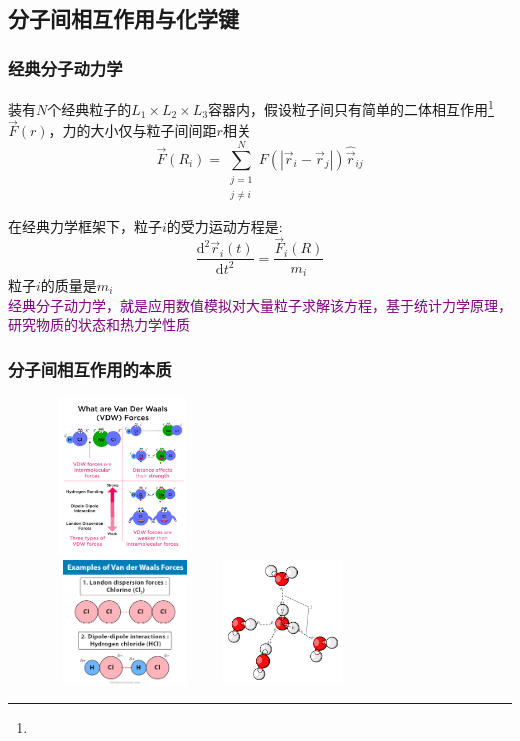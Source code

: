 \subsection{分子间相互作用与化学键}
\frame
{
	\frametitle{经典分子动力学}
	装有$N$个经典粒子的$L_1\times L_2\times L_3$容器内，假设粒子间只有简单的二体相互作用\footnote{\fontsize{7.2pt}{6.2pt}\selectfont{二体作用是粒子间多体相互作用的简化，只考虑粒子两两间彼此相互作用。}}$\vec F(r)$，力的大小仅与粒子间间距$r$相关
	\begin{displaymath}
		\vec F(R_i)=\sum_{\substack{j=1\\j\neq i}}^N F(|\vec r_i-\vec r_j|)\hat{\vec r}_{ij}
	\end{displaymath}
	{\fontsize{7.2pt}{6.2pt}}

	在经典力学框架下，粒子$i$的受力运动方程是:~
	\begin{displaymath}
		\dfrac{\mathrm{d}^2\vec r_i(t)}{\mathrm{d}t^2}=\dfrac{\vec F_i(R)}{m_i}
	\end{displaymath}
	粒子$i$的质量是$m_i$\\
	\textcolor{purple}{经典分子动力学，就是应用数值模拟对大量粒子求解该方程，基于统计力学原理，研究物质的状态和热力学性质}
}

\frame
{
	\frametitle{分子间相互作用的本质}
\begin{figure}[h!]
\centering
\vspace{-10.5pt}
\includegraphics[height=1.65in ,width=1.55in,viewport=0 0 1150 1280,clip]{Figures/van_der_Waals-Force.png}\\
\includegraphics[height=1.30in,width=1.60in,viewport=0 25 600 530,clip]{Figures/Van-Der-Waals-Forces-Bond-Interactions-Examples.jpg}
\includegraphics[height=1.30in,width=1.60in,viewport=0 0 280 230,clip]{Figures/water-H-bond.png}
\label{van_der_Waalss}
\end{figure}
}

